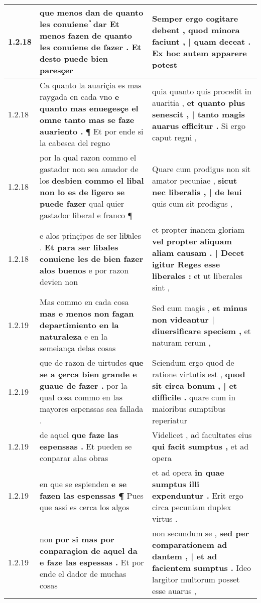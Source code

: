 \begin{tabular}{|p{1cm}|p{6.5cm}|p{6.5cm}|}
1.2.18 & que menos dan de quanto les conuiene ᷤ dar \textbf{ Et menos fazen de quanto les conuiene de fazer . } Et desto puede bien paresçer & Semper ergo cogitare debent , \textbf{ quod minora faciunt , | quam deceat . } Ex hoc autem apparere potest \\\hline
1.2.18 & Ca quanto la auariçia es mas raygada en cada vno \textbf{ e quanto mas enuegesçe el omne tanto mas se faze auariento . } ¶ Et por ende si la cabesca del regno & quia quanto quis procedit in auaritia , \textbf{ et quanto plus senescit , | tanto magis auarus efficitur . } Si ergo caput regni , \\\hline
1.2.18 & por la qual razon commo el gastador non sea amador de los \textbf{ desbien commo el libal non lo es de ligero se puede fazer } qual quier gastador liberal e franco ¶ & Quare cum prodigus non sit amator pecuniae , \textbf{ sicut nec liberalis , | de leui } quis cum sit prodigus , \\\hline
1.2.18 & e alos prinçipes de ser liƀͣales . \textbf{ Et para ser libales conuiene les de bien fazer alos buenos } e por razon devien non & et propter inanem gloriam \textbf{ vel propter aliquam aliam causam . | Decet igitur Reges esse liberales : } et ut liberales sint , \\\hline
1.2.19 & Mas commo en cada cosa \textbf{ mas e menos non fagan departimiento en la naturaleza } e en la semeiança delas cosas & Sed cum magis , \textbf{ et minus non videantur | diuersificare speciem , } et naturam rerum , \\\hline
1.2.19 & que de razon de uirtudes \textbf{ que se a çerca bien grande e guaue de fazer . } por la qual cosa commo en las mayores espenssas sea fallada . & Sciendum ergo quod de ratione virtutis est , \textbf{ quod sit circa bonum , | et difficile . } quare cum in maioribus sumptibus reperiatur \\\hline
1.2.19 & de aquel \textbf{ que faze las espenssas . } Et pueden se conparar alas obras & Videlicet , ad facultates eius \textbf{ qui facit sumptus , } et ad opera \\\hline
1.2.19 & en que se espienden \textbf{ e se fazen las espenssas ¶ } Pues que assi es cerca los algos & et ad opera \textbf{ in quae sumptus illi expenduntur . } Erit ergo circa pecuniam duplex virtus . \\\hline
1.2.19 & non \textbf{ por si mas por conparaçion de aquel da e faze las espessas . } Et por ende el dador de muchas cosas & non secundum se , \textbf{ sed per comparationem ad dantem , | et ad facientem sumptus . } Ideo largitor multorum posset esse auarus , \\\hline

\end{tabular}
